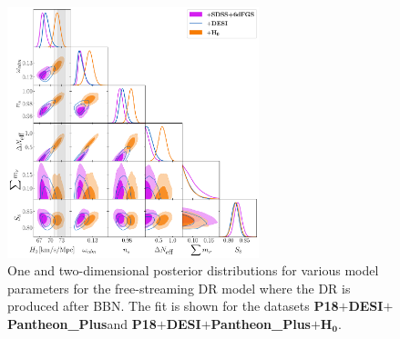 \documentclass[aps,prd,twocolumn,notitlepage,
superscriptaddress,
nofootinbib,floatfix]{revtex4-2}
\newcommand{\planck}{\textbf{P18}}
\newcommand{\desi}{$\mathbf{+}$\textbf{DESI}}
\newcommand{\pantheon}{$\mathbf{+}${\bf Pantheon\_Plus}}
\newcommand{\shoes}{$\mathbf{+ H_0}$}
\begin{document}
\begin{widetext}
\begin{figure}[H]
\centering
    \includegraphics[width=0.65\textwidth]{figures_21_4/all_fsnb.pdf}
    \caption{One and two-dimensional posterior distributions for various model parameters for the free-streaming DR model where the DR is produced after BBN. The fit is shown for the datasets \planck\desi\pantheon and \planck\desi\pantheon\shoes.}
\end{figure}






\end{widetext}
\end{document}
